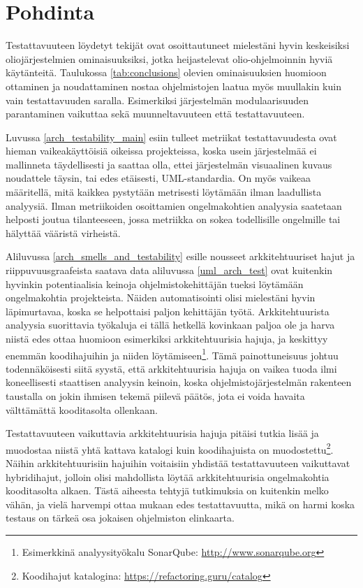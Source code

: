 \documentclass[finnish]{tktltiki2}
\numberwithin{table}{section}
\theoremstyle{definition}
\theoremstyle{remark}
\begin{document}
\newpage



\section{Pohdinta} \label{pondering}


Testattavuuteen löydetyt tekijät ovat osoittautuneet mielestäni hyvin keskeisiksi oliojärjestelmien ominaisuuksiksi, jotka heijastelevat olio-ohjelmoinnin hyviä käytänteitä. Taulukossa \ref{tab:conclusions} olevien ominaisuuksien huomioon ottaminen ja noudattaminen nostaa ohjelmistojen laatua myös muullakin kuin vain testattavuuden saralla. Esimerkiksi järjestelmän modulaarisuuden parantaminen vaikuttaa sekä muunneltavuuteen että testattavuuteen.

Luvussa \ref{arch_testability_main} esiin tulleet metriikat testattavuudesta ovat hieman vaikeakäyttöisiä oikeissa projekteissa, koska usein järjestelmää ei mallinneta täydellisesti ja saattaa olla, ettei järjestelmän visuaalinen kuvaus noudattele täysin, tai edes etäisesti, UML-standardia. On myös vaikeaa määritellä, mitä kaikkea pystytään metrisesti löytämään ilman laadullista analyysiä. Ilman metriikoiden osoittamien ongelmakohtien analyysia saatetaan helposti joutua tilanteeseen, jossa metriikka on sokea todellisille ongelmille tai hälyttää vääristä virheistä. 

Aliluvussa \ref{arch_smells_and_testability} esille nousseet arkkitehtuuriset hajut ja riippuvuusgraafeista saatava data aliluvussa \ref{uml_arch_test} ovat kuitenkin hyvinkin potentiaalisia keinoja ohjelmistokehittäjän tueksi löytämään ongelmakohtia projekteista. Näiden automatisointi olisi mielestäni hyvin läpimurtavaa, koska se helpottaisi paljon kehittäjän työtä. Arkkitehtuurista analyysia suorittavia työkaluja ei tällä hetkellä kovinkaan paljoa ole ja harva niistä edes ottaa huomioon esimerkiksi arkkitehtuurisia hajuja, ja keskittyy enemmän koodihajuihin ja niiden löytämiseen\footnote{Esimerkkinä analyysityökalu SonarQube: \url{http://www.sonarqube.org}}. Tämä painottuneisuus johtuu todennäköisesti siitä syystä, että arkkitehtuurisia hajuja on vaikea tuoda ilmi koneellisesti staattisen analyysin keinoin, koska ohjelmistojärjestelmän rakenteen taustalla on jokin ihmisen tekemä piilevä päätös, jota ei voida havaita välttämättä kooditasolta ollenkaan.

Testattavuuteen vaikuttavia arkkitehtuurisia hajuja pitäisi tutkia lisää ja muodostaa niistä yhtä kattava katalogi kuin koodihajuista on muodostettu\footnote{Koodihajut katalogina: \url{https://refactoring.guru/catalog}}. Näihin arkkitehtuurisiin hajuihin voitaisiin yhdistää testattavuuteen vaikuttavat hybridihajut, jolloin olisi mahdollista löytää arkkitehtuurisia ongelmakohtia kooditasolta alkaen. Tästä aiheesta tehtyjä tutkimuksia on kuitenkin melko vähän, ja vielä harvempi ottaa mukaan edes testattavuutta, mikä on harmi koska testaus on tärkeä osa jokaisen ohjelmiston elinkaarta.
\end{document}
